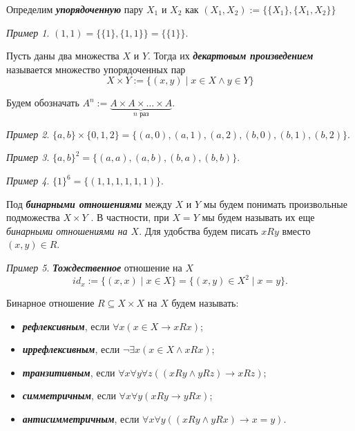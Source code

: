 \documentclass{article}
\theoremstyle{remark}
\newtheorem{example}{Пример}
\begin{document}
\begin{definition}
	Определим \textit{\textbf{упорядоченную}} пару $X_1$ и $X_2$ как $(X_1, X_2) := \{\{X_1\} , \{X_1, X_2\}\}$
\end{definition}

\begin{example}
	$(1,1) = \{\{1\}, \{1,1\}\} = \{\{1\}\}.$
\end{example}

\begin{definition}
	Пусть даны два множества $X$ и $Y$. Тогда их \textbf{\textit{декартовым произведением}} называется множество упорядоченных пар
	$$X\times Y := \{(x,y) \mid x\in X \wedge y\in Y\}$$
	
	Будем обозначать $A^n := \underbrace{A\times A \times \dotsc \times A}_{n \text{ раз}}.$
\end{definition}

\begin{example}
$\{a,b\}\times \{0,1,2\} = \{(a,0),(a,1),(a,2),(b,0),(b,1),(b,2)\}.$
\end{example}

\begin{example}
$\{a,b\}^2 = \{(a,a),(a,b),(b,a),(b,b)\}.$
\end{example}

\begin{example}
$\{1\}^6 = \{(1,1,1,1,1,1)\}.$
\end{example}

\begin{definition}
Под \textit{\textbf{бинарными отношениями}} между $X$ и $Y$ мы будем понимать произвольные подможества $X \times Y$ . В частности, при $X = Y$ мы будем называть их еще \textit{бинарными отношениями на $X$}.
Для удобства будем писать $xRy$ вместо $(x, y) \in R$.
\end{definition}

\begin{example}
\textbf{\textit{Тождественное}} отношение на $X$ $$id_x:= \{(x,x) \mid x\in X\}= \{(x,y)\in  X^2 \mid x=y\}.$$
\end{example}

\begin{definition}
Бинарное отношение $R \subseteq X \times X$ на $X$ будем называть: 
\begin{itemize}

	\item \textbf{\textit{рефлексивным}}, если $\forall x(x \in X \rightarrow xRx)$;
	\item \textbf{\textit{иррефлексивным}}, если $\neg\exists x(x \in X \wedge xRx)$;
	\item \textbf{\textit{транзитивным}}, если $\forall x\forall y\forall z((xRy \wedge yRz) \rightarrow xRz)$; 
	\item \textbf{\textit{симметричным}}, если $\forall x\forall y(xRy \rightarrow yRx)$;
	\item \textbf{\textit{антисимметричным}}, если $\forall x\forall y((xRy \wedge yRx) \rightarrow x = y)$.
\end{itemize}
\end{definition}
\end{document}
